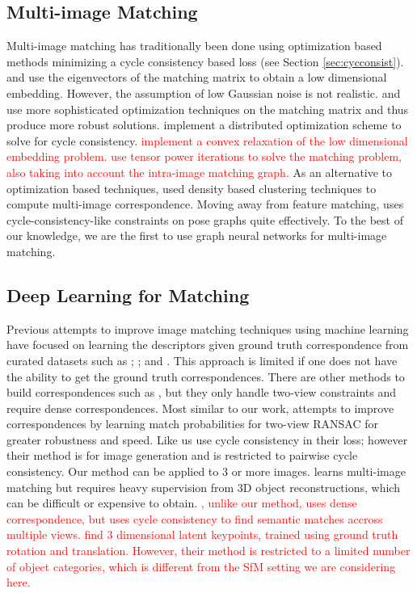 \documentclass{article} %
\begin{document}
\subsection{Multi-image Matching}
Multi-image matching has traditionally been done using optimization based methods minimizing a cycle consistency based loss (see Section \ref{sec:cycconsist}).
\cite{pachauri2013solving} and \cite{arrigoni2017synchronization} use the eigenvectors of the matching matrix to obtain a low dimensional embedding. 
However, the assumption of low Gaussian noise is not realistic.
\cite{zhou2015multi} and \cite{wang2017multi} use more sophisticated optimization techniques on the matching matrix and thus produce more robust solutions.
\cite{leonardos2016distributed} implement a distributed optimization scheme to solve for cycle consistency.
\textcolor{red}{\cite{swoboda2019convex} implement a convex relaxation of the low dimensional embedding problem.}
\textcolor{red}{\cite{shi2016tensor} use tensor power iterations to solve the matching problem, also taking into account the intra-image matching graph.}
As an alternative to optimization based techniques, \cite{tron2017fast} used density based clustering techniques to compute multi-image correspondence.
Moving away from feature matching, \cite{zach2010disambiguating} uses cycle-consistency-like constraints on pose graphs quite effectively.
To the best of our knowledge, we are the first to use graph neural networks for multi-image matching.

\subsection{Deep Learning for Matching}
Previous attempts to improve image matching techniques using machine learning have focused on learning the descriptors given ground truth correspondence from curated datasets such as \cite{zagoruyko2015learning}; \cite{yi2016lift}; and \cite{brachmann2017dsac}.
This approach is limited if one does not have the ability to get the ground truth correspondences.
There are other methods to build correspondences such as \cite{choy2016universal}, but they only handle two-view constraints and require dense correspondences.
Most similar to our work, \cite{yi2018learning} attempts to improve correspondences by learning match probabilities for two-view RANSAC for greater robustness and speed.
Like us \cite{zhu2017unpaired} use cycle consistency in their loss; however their method is for image generation and is restricted to pairwise cycle consistency.
Our method can be applied to 3 or more images. 
\cite{hartmann2017learned} learns multi-image matching but requires heavy supervision from 3D object reconstructions, which can be difficult or expensive to obtain.
\textcolor{red}{\cite{zhou2015flowweb}, unlike our method, uses dense correspondence, but uses cycle consistency to find semantic matches accross multiple views.}
\textcolor{red}{\cite{suwajanakorn2018discovery} find 3 dimensional latent keypoints, trained using ground truth rotation and translation. However, their method is restricted to a limited number of object categories, which is different from the SfM setting we are considering here.}
\end{document}
